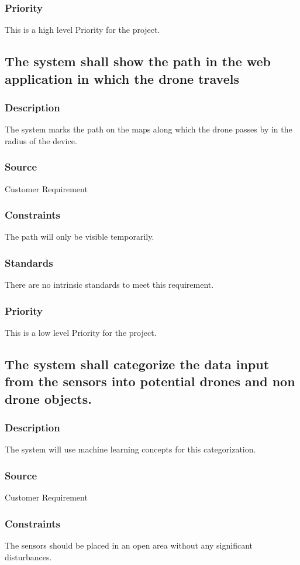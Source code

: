 \subsubsection{Priority}
This is a high level Priority for the project.

\subsection{The system shall show the path in the web application in which the drone travels}
\subsubsection{Description}
The system marks the path on the maps along which the drone passes by in the radius of the device.
\subsubsection{Source}
Customer Requirement
\subsubsection{Constraints}
The path will only be visible temporarily.
\subsubsection{Standards}
There are no intrinsic standards to meet this requirement.
\subsubsection{Priority}
This is a low level Priority for the project.

\subsection{The system shall categorize the data input from the sensors into potential drones and non drone objects.}
\subsubsection{Description}
The system will use machine learning concepts for this categorization.
\subsubsection{Source}
Customer Requirement
\subsubsection{Constraints}
The sensors should be placed in an open area without any significant disturbances.

